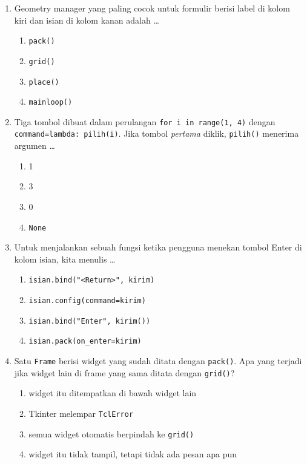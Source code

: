 \begin{enumerate}
  \item Geometry manager yang paling cocok untuk formulir berisi label di kolom kiri dan isian di kolom kanan adalah \ldots
  \begin{enumerate}[label=\alph*.,itemsep=0pt]
    \item \texttt{pack()}
    \item \texttt{grid()}
    \item \texttt{place()}
    \item \texttt{mainloop()}
  \end{enumerate}

  \item Tiga tombol dibuat dalam perulangan \texttt{for i in range(1, 4)} dengan \texttt{command=lambda: pilih(i)}. Jika tombol \emph{pertama} diklik, \texttt{pilih()} menerima argumen \ldots
  \begin{enumerate}[label=\alph*.,itemsep=0pt]
    \item 1
    \item 3
    \item 0
    \item \texttt{None}
  \end{enumerate}

  \item Untuk menjalankan sebuah fungsi ketika pengguna menekan tombol Enter di kolom isian, kita menulis \ldots
  \begin{enumerate}[label=\alph*.,itemsep=0pt]
    \item \texttt{isian.bind("<Return>", kirim)}
    \item \texttt{isian.config(command=kirim)}
    \item \texttt{isian.bind("Enter", kirim())}
    \item \texttt{isian.pack(on\_enter=kirim)}
  \end{enumerate}

  \item Satu \texttt{Frame} berisi widget yang sudah ditata dengan \texttt{pack()}. Apa yang terjadi jika widget lain di frame yang sama ditata dengan \texttt{grid()}?
  \begin{enumerate}[label=\alph*.,itemsep=0pt]
    \item widget itu ditempatkan di bawah widget lain
    \item Tkinter melempar \texttt{TclError}
    \item semua widget otomatis berpindah ke \texttt{grid()}
    \item widget itu tidak tampil, tetapi tidak ada pesan apa pun
  \end{enumerate}


\end{enumerate}
